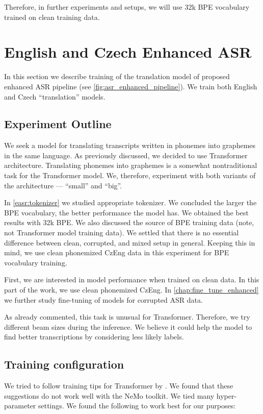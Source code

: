 Therefore, in further experiments and setups, we will use 32k BPE vocabulary trained on clean training data.









\section{English and Czech Enhanced ASR}
\label{easr:english}
In this section we describe training of the translation model of proposed enhanced ASR pipeline (see \cref{fig:asr_enhanced_pipeline}). We train both English and Czech ``translation'' models.

\subsection{Experiment Outline}
\label{easr:outline}
We seek a model for translating transcripts written in phonemes into graphemes in the same language. As previously discussed, we decided to use Transformer architecture. Translating phonemes into graphemes is a somewhat nontraditional task for the Transformer model. We, therefore, experiment with both variants of the architecture --- ``small'' and ``big''. 

In \cref{easr:tokenizer} we studied appropriate tokenizer. We concluded the larger the BPE vocabulary, the better performance the model has. We obtained the best results with 32k BPE. We also discussed the source of BPE training data (note, not Transformer model training data). We settled that there is no essential difference between clean, corrupted, and mixed setup in general. Keeping this in mind, we use clean phonemized CzEng data in this experiment for BPE vocabulary training. 

First, we are interested in model performance when trained on clean data. In this part of the work, we use clean phonemized CzEng. In \cref{chap:fine_tune_enhanced} we further study fine-tuning of models for corrupted ASR data.

As already commented, this task is unusual for Transformer. Therefore, we try different beam sizes during the inference. We believe it could help the model to find better transcriptions by considering less likely labels.

\subsection{Training configuration}
\label{easr:training}
We tried to follow training tips for Transformer by . We found that these suggestions do not work well with the NeMo toolkit. We tied many hyper-parameter settings. We found the following to work best for our purposes:

